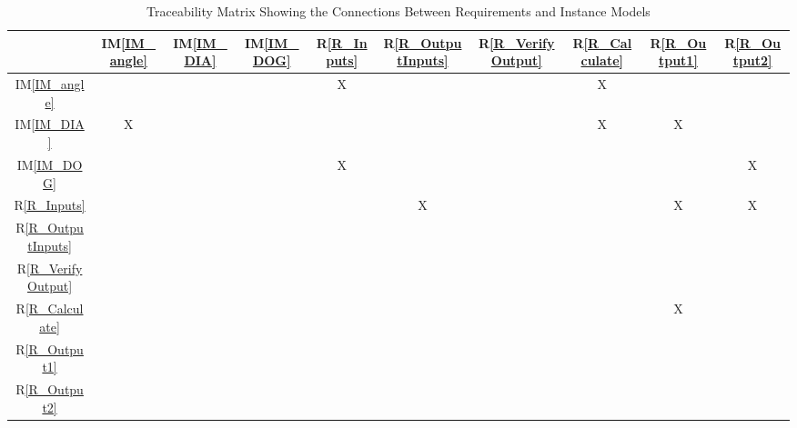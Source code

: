 \documentclass[12pt]{article}
\newcommand{\iref}[1]{IM\ref{#1}}
\newcommand{\rref}[1]{R\ref{#1}}
\begin{document}
	\begin{table}[h!]
		\centering
		\begin{tabular}{|c|c|c|c|c|c|c|c|c|c|}
			\hline
			& \iref{IM_angle}& \iref{IM_DIA}& \iref{IM_DOG}& \rref{R_Inputs}& \rref{R_OutputInputs}& \rref{R_VerifyOutput}& \rref{R_Calculate}& \rref{R_Output1}& \rref{R_Output2} \\
			\hline
			\iref{IM_angle}            & & & & X& & & X& &\\ \hline
			\iref{IM_DIA}            & X& & & & & & X& X&\\ \hline
			\iref{IM_DOG}          & & & & X& & & & &X\\ \hline
			\rref{R_Inputs}          & & & & & X& & & X&X\\ \hline
			\rref{R_OutputInputs}     & & & & & & & & &\\ \hline
			\rref{R_VerifyOutput}    & & & & & & & & &\\ \hline
			\rref{R_Calculate}   & & & & & & & & X&\\ \hline
			\rref{R_Output1}  & & & & & & & & &\\ \hline
			\rref{R_Output2}  & & & & & & & & &\\ \hline
		\end{tabular}
		\caption{Traceability Matrix Showing the Connections Between Requirements and Instance Models}
		\label{Table:R_trace}
	\end{table}
	
	
	
\end{document}
